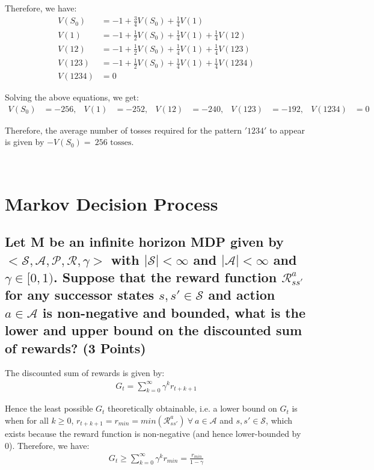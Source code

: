 \documentclass{article}
\renewcommand{\S}{\mathcal{S}}
\newcommand{\A}{\mathcal{A}}
\renewcommand{\P}{\mathcal{P}}
\newcommand{\R}{\mathcal{R}}
\begin{document}
\noindent
Therefore, we have:
\begin{align}
	V(S_0) &= -1 + \frac{3}{4} V(S_0) + \frac{1}{4} V(1) \\
	V(1) &= -1 + \frac{1}{2} V(S_0) + \frac{1}{4} V(1) + \frac{1}{4} V(12) \\
	V(12) &= -1 + \frac{1}{2} V(S_0) + \frac{1}{4} V(1) + \frac{1}{4} V(123) \\
	V(123) &= -1 + \frac{1}{2} V(S_0) + \frac{1}{4} V(1) + \frac{1}{4} V(1234) \\
	V(1234) &= 0
\end{align}

\noindent
Solving the above equations, we get:
\begin{align*}
	V(S_0) &= -256, &
	V(1) &= -252, &
	V(12) &= -240, &
	V(123) &= -192, &
	V(1234) &= 0 &
\end{align*}

\noindent
Therefore, the average number of tosses required for the pattern $'1234'$ to appear is given by $-V(S_0) =\ \boxed{256 \text{ tosses.}}$

\,

\section{Markov Decision Process}
\subsection{Let M be an infinite horizon MDP given by $< \S, \A, \P, \R, \gamma >$ with $|\S| < \infty$ and $|\A| < \infty$ and $\gamma \in [0, 1)$. Suppose that the reward function $\R^a_{ss'}$ for any successor states $s, s' \in \S$ and action $a \in \A$ is non-negative and bounded, what is the lower and upper bound on the discounted sum of rewards? (3 Points)}


The discounted sum of rewards is given by:
\begin{align}
	G_t = \sum_{k=0}^\infty \gamma^k r_{t+k+1}
\end{align}

\noindent
Hence the least possible $G_t$ theoretically obtainable, i.e. a lower bound on $G_t$ is when for all $k \geq 0$, $r_{t+k+1} = r_{min} = min(\R^a_{ss'})\ \forall \ a \in \A$ and $s, s' \in \S$, which exists because the reward function is non-negative (and hence lower-bounded by 0). Therefore, we have:
\begin{align} 
	\boxed{G_t \geq \sum_{k=0}^\infty \gamma^k r_{min} = \frac{r_{min}}{1 - \gamma} }
\end{align}
\end{document}
